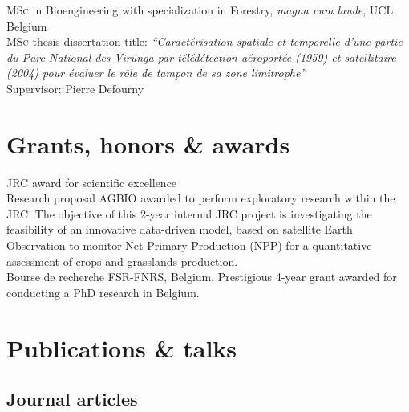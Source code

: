 \documentclass[11pt, a4paper]{article} %
\newcommand{\years}[1]{\marginnote{\scriptsize #1}} %
\begin{document}
\years{\raggedleft2005}\textsc{MSc} in Bioengineering with specialization in Forestry, \textit{magna cum laude}, UCL Belgium\\
\textsc{MSc} thesis dissertation title: \textit{``Caractérisation spatiale et temporelle d'une partie du Parc National des Virunga par télédétection aéroportée (1959) et satellitaire (2004) pour évaluer le rôle de tampon de sa zone limitrophe''}\\
Supervisor: Pierre Defourny\\


\section*{Grants, honors \& awards}

\years{\raggedleft2016} JRC award for scientific excellence\\

\years{\raggedleft2015} Research proposal AGBIO awarded to perform exploratory research within the JRC. The objective of this 2-year internal JRC project is investigating the feasibility of an innovative data-driven model, based on satellite Earth Observation to monitor Net Primary Production (NPP) for a quantitative assessment of crops and grasslands production.\\

\years{\raggedleft2011} Bourse de recherche FSR-FNRS, Belgium. Prestigious 4-year grant awarded for conducting a PhD research in Belgium.


\section*{Publications \& talks}

\subsection*{Journal articles}

\def\FormatName#1{%
  \IfSubStr{#1}{Duveiller}{\textbf{#1}}{#1}%
}
\end{document}
